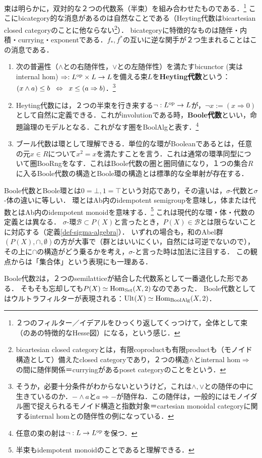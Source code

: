 \documentclass[uplatex, dvipdfmx]{jsreport}
\renewcommand{\B}{\mathcal{B}}
\begin{document}
\begin{definition}
    束は明らかに，双対的な２つの代数系（半束）を組み合わせたものである．\footnote{２つのフィルター／イデアルをひっくり返してくっつけて，全体として束（のあの特徴的なHesse図）になる，という感じ．}
    ここにbicategory的な消息があるのは自然なことである（Heyting代数はbicartesian closed categoryのことに他ならない\footnote{bicartesian closed categoryとは，有限coproductも有限productも（モノイド構造として）備えたclosed categoryであり，２つの構造$\land$とinternal hom$\Rightarrow$の間に随伴関係＝curryingがあるposet categoryのことをという．}）．
    bicategoryに特徴的なものは随伴・内積・currying・exponentである．$f_*,f^*$の互いに逆な関手が２つ生まれることはこの消息である．
    \begin{enumerate}
        \item 次の普遍性（$\land$との右随伴性，$\lor$との左随伴性）を満たすbicunctor (実はinternal hom) $\Rightarrow:L^{\mathrm{op}}\times L\to L$を備える束$L$を\textbf{Heyting代数}という：$(x\land a)\le b\;\;\Leftrightarrow\;\; x\le(a\Rightarrow b)$．\footnote{そうか，必要十分条件がわからないというけど，これは$\land,\lor$との随伴の中に生きているのか．$-\land a$と$a\Rightarrow-$が随伴ね．この随伴は，一般的にはモノイダル圏で捉えられるモノイド構造と指数対象＝cartesian monoidal categoryに関するinternal homとの随伴性の例になっている．}
        \item Heyting代数には，２つの半束を行き来する$\lnot:L^{\mathrm{op}}\to L$が，$\lnot x:=(x\Rightarrow 0)$として自然に定義できる．これがinvolutionである時，\textbf{Boole代数}といい，命題論理のモデルとなる．これがなす圏をBoolAlgと表す．\footnote{任意の束の射は$\lnot:L\to L^{\mathrm{op}}$を保つ．}
        \item ブール代数は環として理解できる．単位的な環がBooleanであるとは，任意の元$x\in R$について$x^2=x$を満たすことを言う．これは通常の環準同型について圏BooRngをなす．これはBoole代数の圏と圏同値になり，１つの集合$R$に入るBoole代数の構造とBoole環の構造とは標準的な全単射が存在する．
    \end{enumerate}
\end{definition}
\begin{remark}
    Boole代数とBoole環とは$0=\bot,1=\top$という対応であり，その違いは，$\sigma$-代数と$\sigma$-体の違いに等しい．
    環とはAb内のidempotent semigroupを意味し，体または代数とはAb内のidempotent monoidを意味する．\footnote{半束もidempotent monoidのことであると理解できる．}
    これは現代的な環・体・代数の定義とは異なる．
    $\sigma$-環$\B\subset P(X)$と言ったとき，$P(X)\in\B$とは限らないことに対応する（定義\ref{def-sigma-algebra}）．
    いずれの場合も，和のAbel群$(P(X),\cap,\emptyset)$の方が大事で（群とはいいにくい，自然には可逆でないので），
    その上に$\cap$の構造がどう乗るかを考え，$\sigma$-と言った時は加法に注目する．
    この観点からは「集合体」という表現にも一理ある．
\end{remark}
\begin{remark}
    Boole代数$2$は，２つのsemilatticeが結合した代数系として一番退化した形である．
    そもそも忘却しても$P(X)\simeq\mathrm{Hom}_{\mathrm{Set}}(X,2)$なのであった．
    Boole代数としてはウルトラフィルターが表現される：$\mathrm{Ult}(X)\simeq\mathrm{Hom}_{\mathrm{BoolAlg}}(X,2)$．
\end{remark}
\end{document}
